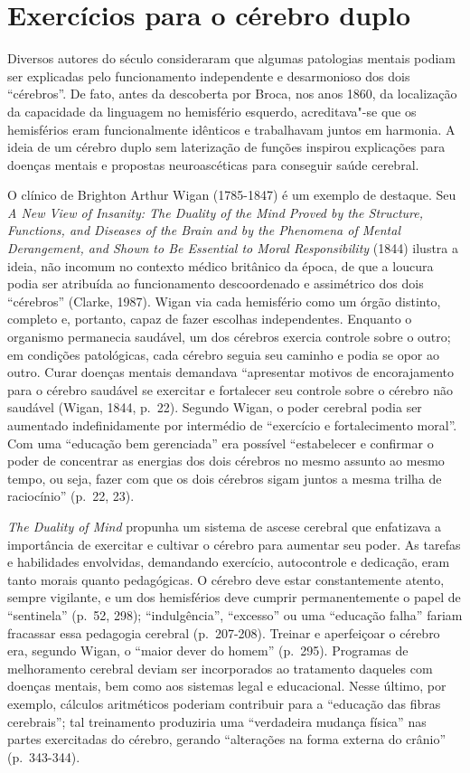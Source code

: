 \section{Exercícios para o cérebro duplo}

Diversos autores do século  consideraram que algumas patologias
mentais podiam ser explicadas pelo funcionamento independente e
desarmonioso dos dois ``cérebros''. De fato, antes da descoberta por
Broca, nos anos 1860, da localização da capacidade da linguagem no
hemisfério esquerdo, acreditava"-se que os hemisférios eram
funcionalmente idênticos e trabalhavam juntos em harmonia. A ideia de um
cérebro duplo sem laterização de funções inspirou explicações para
doenças mentais e propostas neuroascéticas para conseguir saúde
cerebral.

O clínico de Brighton Arthur Wigan (1785-1847) é um exemplo de destaque.
Seu \emph{A New View of Insanity: The Duality of the Mind Proved by the
Structure, Functions, and Diseases of the Brain and by the Phenomena of
Mental Derangement, and Shown to Be Essential to Moral Responsibility}
(1844) ilustra a ideia, não incomum no contexto médico britânico da
época, de que a loucura podia ser atribuída ao funcionamento
descoordenado e assimétrico dos dois ``cérebros'' (Clarke, 1987). Wigan
via cada hemisfério como um órgão distinto, completo e, portanto, capaz
de fazer escolhas independentes. Enquanto o organismo permanecia
saudável, um dos cérebros exercia controle sobre o outro; em condições
patológicas, cada cérebro seguia seu caminho e podia se opor ao outro.
Curar doenças mentais demandava ``apresentar motivos de encorajamento
para o cérebro saudável se exercitar e fortalecer seu controle sobre o
cérebro não saudável (Wigan, 1844, p.~22). Segundo Wigan, o poder
cerebral podia ser aumentado indefinidamente por intermédio de
``exercício e fortalecimento moral''. Com uma ``educação bem
gerenciada'' era possível ``estabelecer e confirmar o poder de
concentrar as energias dos dois cérebros no mesmo assunto ao mesmo
tempo, ou seja, fazer com que os dois cérebros sigam juntos a mesma
trilha de raciocínio'' (p.~22, 23).

\emph{The Duality of Mind} propunha um sistema de ascese cerebral que
enfatizava a importância de exercitar e cultivar o cérebro para aumentar
seu poder. As tarefas e habilidades envolvidas, demandando exercício,
autocontrole e dedicação, eram tanto morais quanto pedagógicas. O
cérebro deve estar constantemente atento, sempre vigilante, e um dos
hemisférios deve cumprir permanentemente o papel de ``sentinela'' (p.~52,
298); ``indulgência'', ``excesso'' ou uma ``educação falha'' fariam
fracassar essa pedagogia cerebral (p.~207-208). Treinar e aperfeiçoar o
cérebro era, segundo Wigan, o ``maior dever do homem'' (p.~295).
Programas de melhoramento cerebral deviam ser incorporados ao tratamento
daqueles com doenças mentais, bem como aos sistemas legal e educacional.
Nesse último, por exemplo, cálculos aritméticos poderiam contribuir para
a ``educação das fibras cerebrais''; tal treinamento produziria uma
``verdadeira mudança física'' nas partes exercitadas do cérebro, gerando
``alterações na forma externa do crânio'' (p.~343-344).

